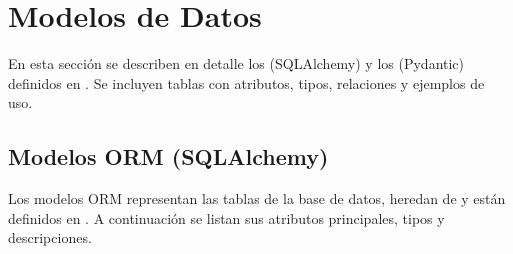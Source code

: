 \documentclass[letterpaper,10pt,spanish]{sphinxmanual}
\begin{document}
\sphinxstepscope


\chapter{Modelos de Datos}
\label{\detokenize{modelos:modelos-de-datos}}\label{\detokenize{modelos::doc}}
\sphinxAtStartPar
En esta sección se describen en detalle los  (SQLAlchemy) y los  (Pydantic) definidos en . Se incluyen tablas con atributos, tipos, relaciones y ejemplos de uso.


\section{Modelos ORM (SQLAlchemy)}
\label{\detokenize{modelos:modelos-orm-sqlalchemy}}
\sphinxAtStartPar
Los modelos ORM representan las tablas de la base de datos, heredan de  y están definidos en . A continuación se listan sus atributos principales, tipos y descripciones.
\end{document}
